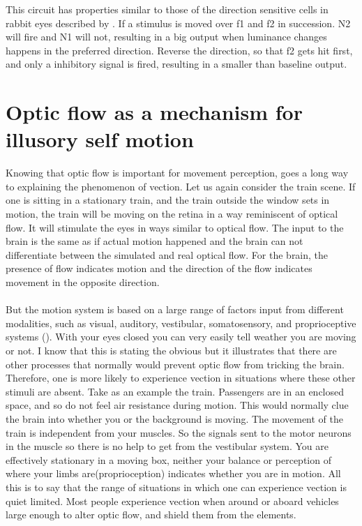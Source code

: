 \documentclass[11pt,a4paper,oneside,table,xcdraw]{article}
\begin{document}
This circuit has properties similar to those of the direction sensitive cells in rabbit eyes described by \cite{Barlow1965}. If a stimulus is moved over f1 and f2 in succession. N2 will fire and N1 will not, resulting in a big output when luminance changes happens in the preferred direction. Reverse the direction, so that f2 gets hit first, and only a inhibitory signal is fired, resulting in a smaller than baseline output.
\section{Optic flow as a mechanism for illusory self motion}
Knowing that optic flow is important for movement perception, goes a long way to explaining the phenomenon of vection. Let us again consider the train scene. If one is sitting in a stationary train, and the train outside the window sets in motion, the train will be moving on the retina in a way reminiscent of optical flow. It will stimulate the eyes in ways similar to optical flow. The input to the brain is the same as if actual motion happened and the brain can not differentiate between the simulated and real optical flow. For the brain, the presence of flow indicates motion and the direction of the flow indicates movement in the opposite direction.\\\\
But the motion system is based on a large range of factors input from different modalities, such as visual, auditory, vestibular, somatosensory, and proprioceptive systems (\cite{wind}). With your eyes closed you can very easily tell weather you are moving or not. I know that this is stating the obvious but it illustrates that there are other processes that normally would prevent optic flow from tricking the brain. Therefore, one is more likely to experience vection in situations where these other stimuli are absent. Take as an example the train. Passengers are in an enclosed space, and so do not feel air resistance during motion. This would normally clue the brain into whether you or the background is moving. The movement of the train is independent from your muscles. So the signals sent to the motor neurons in the muscle so there is no help to get from the vestibular system. You are effectively stationary in a moving box, neither your balance or perception of where your limbs are(proprioception) indicates whether you are in motion. All this is to say that the range of situations in which one can experience vection is quiet limited. Most people experience vection when around or aboard vehicles large enough to alter optic flow, and shield them from the elements.\\\\
\end{document}

